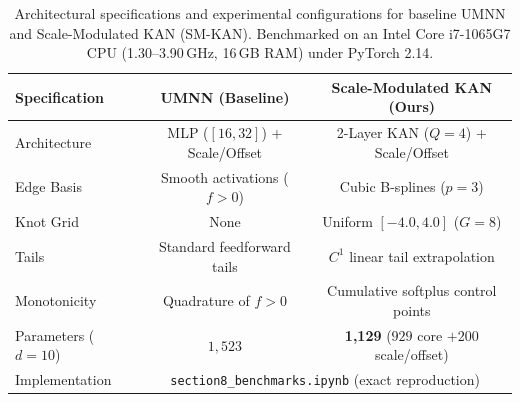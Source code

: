 \documentclass[11pt,a4paper]{article}
\theoremstyle{plain}
\theoremstyle{definition}
\theoremstyle{remark}
\begin{document}
\begin{table}[H]
\centering
\footnotesize
\setlength{\tabcolsep}{4.0pt}
\caption{Architectural specifications and experimental configurations for baseline UMNN and Scale-Modulated KAN (SM-KAN). Benchmarked on an Intel Core i7-1065G7 CPU (1.30--3.90\,GHz, 16\,GB RAM) under PyTorch 2.14.}
\label{tab:architecture_specs}
\begin{tabular}{lcc}
\toprule
\textbf{Specification} & \textbf{UMNN (Baseline)} & \textbf{Scale-Modulated KAN (Ours)} \\
\midrule
Architecture & MLP ($[16, 32]$) + Scale/Offset & 2-Layer KAN ($Q=4$) + Scale/Offset \\
Edge Basis & Smooth activations ($f > 0$) & Cubic B-splines ($p = 3$) \\
Knot Grid & None & Uniform $[-4.0, 4.0]$ ($G = 8$) \\
Tails & Standard feedforward tails & $C^1$ linear tail extrapolation \\
Monotonicity & Quadrature of $f > 0$ & Cumulative softplus control points \\
Parameters ($d=10$) & $1{,}523$ & \textbf{1{,}129} ($929$ core $+ 200$ scale/offset) \\
Implementation & \multicolumn{2}{c}{\texttt{section8\_benchmarks.ipynb} (exact reproduction)} \\
\bottomrule
\end{tabular}
\end{table}
\end{document}
